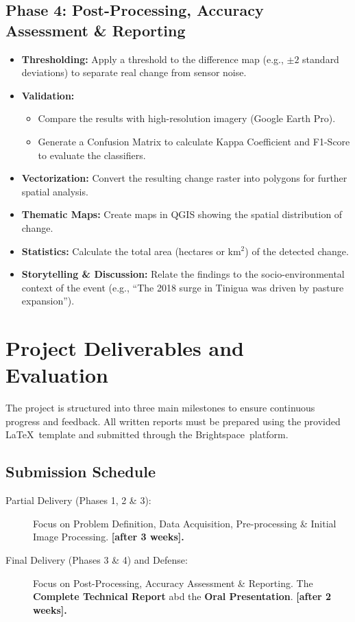 \documentclass{article}
\begin{document}
\subsection*{Phase 4: Post-Processing, Accuracy Assessment \& Reporting}
\begin{itemize}
    \item \textbf{Thresholding:} Apply a threshold to the difference map (e.g., $\pm 2$ standard deviations) to separate real change from sensor noise.
    \item \textbf{Validation:}
    \begin{itemize}
        \item Compare the results with high-resolution imagery (Google Earth Pro).
        \item Generate a Confusion Matrix to calculate Kappa Coefficient and F1-Score to evaluate the classifiers.
    \end{itemize}
    \item \textbf{Vectorization:} Convert the resulting change raster into polygons for further spatial analysis.
    \item \textbf{Thematic Maps:} Create maps in QGIS showing the spatial distribution of change.
    \item \textbf{Statistics:} Calculate the total area (hectares or km$^2$) of the detected change.
    \item \textbf{Storytelling \& Discussion:} Relate the findings to the socio-environmental context of the event (e.g., ``The 2018 surge in Tinigua was driven by pasture expansion'').
\end{itemize}

\section{Project Deliverables and Evaluation}

The project is structured into three main milestones to ensure continuous progress and feedback. All written reports must be prepared using the provided \LaTeX\ template and submitted through the Brightspace\texttrademark\ platform.

\subsection*{Submission Schedule}

\begin{description}

    \item[Partial Delivery (Phases 1, 2 \& 3):] Focus on Problem Definition, Data Acquisition, Pre-processing \& Initial Image Processing. \textbf{[after 3 weeks].}


    \item[Final Delivery (Phases 3 \& 4) and Defense:] Focus on Post-Processing, Accuracy Assessment \& Reporting.  The \textbf{Complete Technical Report} abd the \textbf{Oral Presentation}. \textbf{[after 2 weeks].}

\end{description}
\end{document}
